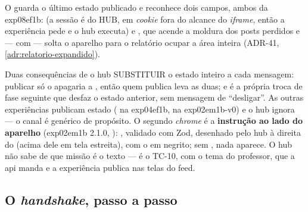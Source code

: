 \begin{nota}[title={NOTA --- o que o hub faz com o \cd{exp:estado}}]
O  guarda o último estado publicado e reconhece dois campos, ambos
da exp08ef1b:  (a sessão é do HUB, em \emph{cookie} 
fora do alcance do \emph{iframe}, então a experiência pede e o hub executa) e
, que acende a moldura dos posts perdidos e --- com
 --- solta o aparelho para o relatório ocupar a área
inteira (ADR-41, \ref{adr:relatorio-expandido}).

Duas consequências de o hub SUBSTITUIR o estado inteiro a cada mensagem:
publicar só o  apagaria a , então quem publica leva as duas;
e é a própria troca de fase seguinte que desfaz o estado anterior, sem
mensagem de ``desligar''. As outras experiências publicam estado
( na exp04ef1b,  na exp02em1b-v0) e o hub
ignora --- o canal é genérico de propósito. O segundo \emph{chrome} é a
\textbf{instrução ao lado do aparelho} (exp02em1b 2.1.0, ):
, validado com Zod, desenhado
pelo hub à direita do  (acima dele em tela estreita), com
o  em negrito; sem , nada aparece. O hub não sabe de
que missão é o texto --- é o TC-10, com o tema do professor, que a api manda
e a experiência publica nas telas do feed.
\end{nota}

\subsection{O \emph{handshake}, passo a passo}

